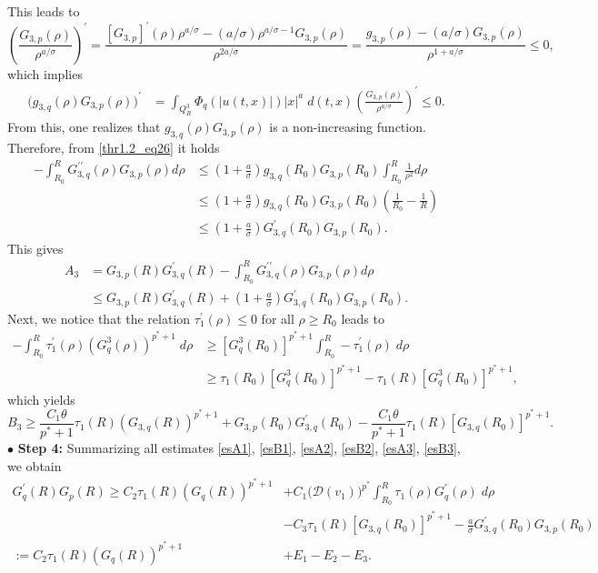 \documentclass[11pt,reqno]{amsart}
\newcommand{\tron}[1]{\left( #1 \right)}
\numberwithin{equation}{section}
\begin{document}
This leads to
\[
\tron{\frac{G_{3,p}(\rho)}{\rho^{a/\sigma}}}^{\prime}=\frac{[G_{3,p}]^{\prime}(\rho)\rho^{a/\sigma}-(a/\sigma)\rho^{a/\sigma-1}G_{3,p}(\rho)}{\rho^{2a/\sigma}}=\frac{g_{3,p}(\rho)-(a/\sigma)G_{3,p}(\rho)}{\rho^{1+a/\sigma}}\leq 0,
\]
which implies
\[
\begin{aligned}
\big(g_{3,q}(\rho)G_{3,p}(\rho)\big)^{\prime}&=\int_{Q^3_R}\Phi_q(|u(t,x)|)|x|^{a}\;d(t,x)\tron{\frac{G_{3,p}(\rho)}{\rho^{a/\sigma}}}^{\prime}\leq 0.
\end{aligned}
\]
From this, one realizes that $g_{3,q}(\rho)G_{3,p}(\rho)$ is a non-increasing function. Therefore, from \eqref{thr1.2_eq26} it holds
\begin{align*}
-\int_{R_0}^{R}G^{\prime \prime}_{3,q}(\rho)G_{3,p}(\rho)d\rho&\leq \tron{1+\frac{a}{\sigma}}g_{3,q}(R_0)G_{3,p}(R_0)\int_{R_0}^{R}\frac{1}{\rho^2}d\rho\\
&\leq \tron{1+\frac{a}{\sigma}}g_{3,q}(R_0)G_{3,p}(R_0)\tron{\frac{1}{R_0}-\frac{1}{R}}\\
&\leq \tron{1+\frac{a}{\sigma}}G^{\prime}_{3,q}(R_0)G_{3,p}(R_0).
\end{align*}
This gives
\begin{align}
A_3&=G_{3,p}(R)G^{\prime}_{3,q}(R)-\int_{R_0}^{R}G^{\prime \prime}_{3,q}(\rho)G_{3,p}(\rho)d\rho\nonumber\\
&\leq G_{3,p}(R)G^{\prime}_{3,q}(R)+\tron{1+\frac{a}{\sigma}}G^{\prime}_{3,q}(R_0)G_{3,p}(R_0).\label{esA3}
\end{align}
Next, we notice that the relation $\tau_1^{\prime}(\rho)\leq 0$ for all $\rho\geq R_0$ leads to
\[
\begin{aligned}
-\int_{R_0}^{R}\tau^{\prime}_1(\rho)(G^{3}_q(\rho))^{p^*+1}\;d\rho &\geq [G^{3}_q(R_0)]^{p^*+1}\int_{R_0}^{R}-\tau^{\prime}_1(\rho)\;d\rho  \\
&\geq \tau_1(R_0)[G^{3}_q(R_0)]^{p^*+1}-\tau_1(R)[G^{3}_q(R_0)]^{p^*+1},
\end{aligned}
\]
which yields
\begin{equation}\label{esB3}
B_3\geq \frac{C_1\theta}{p^*+1} \tau_1(R)\left(G_{3,q}(R)\right)^{p^*+1}+G_{3,p}\left(R_0\right) G^{\prime}_{3,q}\left(R_0\right)-\frac{C_1\theta}{p^*+1}\tau_1(R)[G_{3,q}(R_0)]^{p^*+1}.
\end{equation}
\noindent $\bullet$ {\bf Step 4:}
Summarizing all estimates \eqref{esA1}, \eqref{esB1}, \eqref{esA2}, \eqref{esB2}, \eqref{esA3}, \eqref{esB3}, we obtain
\begin{align}
G^{\prime}_q(R)G_p(R)\geq C_2\tau_1(R)(G_q(R))^{p^*+1}&+C_1\big(\mathcal{D}(v_1)\big)^{p^*}\int_{R_0}^{R}\tau_1(\rho)G^{\prime}_q(\rho)\;d\rho\nonumber\\
&-C_3\tau_1(R)[G_{3,q}(R_0)]^{p^*+1}-\frac{a}{\sigma}G^{\prime}_{3,q}(R_0)G_{3,p}(R_0)\nonumber\\
:=C_2\tau_1(R)(G_q(R))^{p^*+1}&+E_1-E_2-E_3.\label{thr1.2_eq27}
\end{align}
\end{document}
